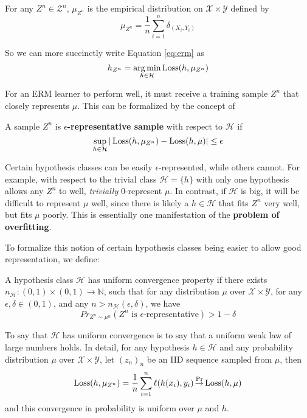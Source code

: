 \begin{notn}
For any $Z^n\in \mathcal{Z}^n$, $\mu_{Z^n}$ is the empirical distribution on $\mathcal{X}\times\mathcal{Y}$ defined by
\begin{equation}
	\mu_{Z^n} = \frac 1 n \sum_{i=1}^n \delta_{(X_i, Y_i)}
\end{equation}
\end{notn}

So we can more succinctly write Equation \ref{eq:erm} as 
\begin{equation}
\label{eq:erm_2}
h_{Z^n} = \operatorname*{arg\,min}_{h\in\mathcal{H}} \operatorname{Loss}(h, \mu_{Z^n})
\end{equation}



For an ERM learner to perform well, it must receive a training sample $Z^n$ that closely represents $\mu$. This can be formalized by the concept of 
\begin{defn}
A sample $Z^n$ is \textbf{$\epsilon$-representative sample} with respect to $\mathcal{H}$ if 
\begin{equation}
\sup_{h\in\mathcal{H}}| \operatorname{Loss}(h, \mu_{Z^n}) - \operatorname{Loss}(h, \mu)|\le \epsilon
\end{equation}
\end{defn}

Certain hypothesis classes can be easily $\epsilon$-represented, while others cannot. For example, with respect to the trivial class $\mathcal{H} = \{h\}$ with only one hypothesis allows any $Z^n$ to well, \textit{trivially} $0$-represent $\mu$. In contrast, if $\mathcal{H}$ is big, it will be difficult to represent $\mu$ well, since there is likely a $h\in \mathcal{H}$ that fits $Z^n$ very well, but fits $\mu$ poorly. This is essentially one manifestation of the \textbf{problem of overfitting}.

To formalize this notion of certain hypothesis classes being easier to allow good representation, we define:

\begin{defn}
A hypothesis class $\mathcal{H}$ has uniform convergence property if there exists $n_{\mathcal{H}}: (0, 1)\times(0, 1) \to \mathbb{N}$, such that for any distribution $\mu$ over $\mathcal{X}\times\mathcal{Y}$, for any $\epsilon, \delta \in (0, 1)$, and any $n > n_{\mathcal{H}}(\epsilon, \delta)$, we have 
\begin{equation}
  Pr_{Z^n\sim \mu^n}(Z^n \text{ is }\epsilon\text{-representative}) > 1 - \delta
\end{equation}
\end{defn}
To say that $\mathcal{H}$ has uniform convergence is to say that a uniform weak law of large numbers holds. In detail,  for any hypothesis $h\in \mathcal{H}$ and any probability distribution $\mu$ over $\mathcal{X}\times \mathcal{Y}$, let $(z_n)_n$ be an IID sequence sampled from $\mu$, then 
$$\operatorname{Loss}(h, \mu_{Z^n} ) = \frac 1 n \sum_{i = 1}^n \ell(h(x_i), y_i)\operatorname*{\stackrel{\text {Pr}}{\to}} \operatorname{Loss}(h, \mu)$$
and this convergence in probability is uniform over $\mu$ and $h$.

